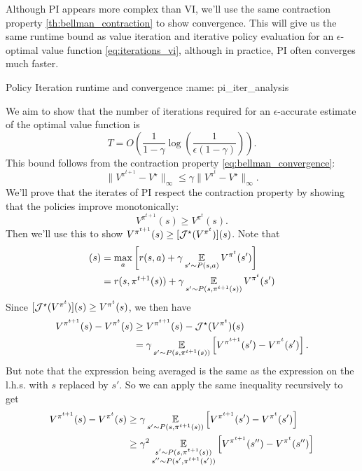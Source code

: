 \documentclass[\main/main]{subfiles}
\begin{document}
Although PI appears more complex than VI, we'll use the same contraction property \eqref{th:bellman_contraction} to show convergence. This will give us the same runtime bound as value iteration and iterative policy evaluation for an $\epsilon$-optimal value function \eqref{eq:iterations_vi}, although in practice, PI often converges much faster.

\begin{theorem}{Policy Iteration runtime and convergence}
:name: pi_iter_analysis

We aim to show that the number of iterations required for an $\epsilon$-accurate estimate of the optimal value function is
\[
    T = O\left( \frac{1}{1-\gamma} \log\left(\frac{1}{\epsilon (1-\gamma)}\right) \right).
\]
This bound follows from the contraction property \eqref{eq:bellman_convergence}:
\[
    \|V^{\pi^{t+1}} - V^\star \|_{\infty} \le \gamma \|V^{\pi^{t}} - V^\star \|_{\infty}.
\]
We'll prove that the iterates of PI respect the contraction property by showing that the policies improve monotonically:
\[
    V^{\pi^{t+1}}(s) \ge V^{\pi^{t}}(s).
\]
Then we'll use this to show $V^{\pi^{t+1}}(s) \ge [\mathcal{J}^{\star}(V^{\pi^{t}})](s)$. Note that
\begin{align*}
    [\bop^{\star} (V^{\pi^{t}})](s) &= \max_a \left[ r(s, a) + \gamma \E_{s' \sim P(s, a)} V^{\pi^{t}}(s') \right] \\
    &= r(s, \pi^{t+1}(s)) + \gamma \E_{s' \sim P(s, \pi^{t+1}(s))} V^{\pi^{t}}(s')
\end{align*}
Since $[\mathcal{J}^{\star}(V^{\pi^{t}})](s) \ge V^{\pi^{t}}(s)$, we then have
\begin{equation}
    \begin{aligned}
        V^{\pi^{t+1}}(s) - V^{\pi^{t}}(s) &\ge V^{\pi^{t+1}}(s) - \mathcal{J}^{\star} (V^{\pi^{t}})(s) \\
        &= \gamma \operatorname*{\mathbb{E}}_{s' \sim P(s, \pi^{t+1}(s))} \left[V^{\pi^{t+1}}(s') -  V^{\pi^{t}}(s') \right].
    \end{aligned} \label{eq:pi_iter_proof}
\end{equation}
But note that the expression being averaged is the same as the expression on the l.h.s. with $s$ replaced by $s'$. So we can apply the same inequality recursively to get
\begin{align*}
    V^{\pi^{t+1}}(s) - V^{\pi^{t}}(s) &\ge  \gamma \E_{s' \sim P(s, \pi^{t+1}(s))} \left[V^{\pi^{t+1}}(s') -  V^{\pi^{t}}(s') \right] \\
    &\ge \gamma^2 \E_{\substack{s' \sim P(s, \pi^{t+1}(s)) \\ s'' \sim P(s', \pi^{t+1}(s'))}} \left[V^{\pi^{t+1}}(s'') -  V^{\pi^{t}}(s'') \right]\\

\end{align*}
\end{theorem}
\end{document}
